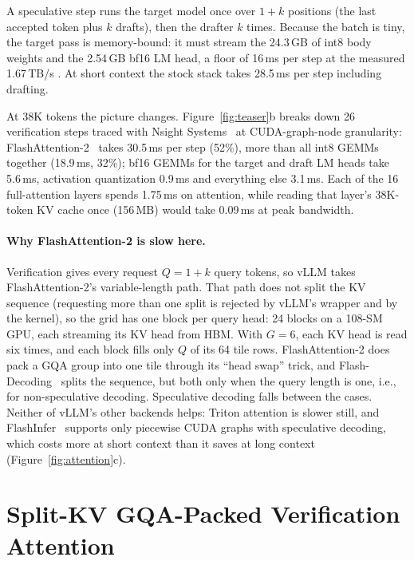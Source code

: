 \documentclass[acmtog,nonacm,screen]{acmart}
\newcommand{\ms}{\,ms\xspace}
\newcommand{\ie}{i.e.,\xspace}
\begin{document}
A speculative step runs the target model once over $1{+}k$ positions (the last accepted token plus $k$ drafts), then
the drafter $k$ times. Because the batch is tiny, the target pass is memory-bound: it must stream the 24.3\,GB of
int8 body weights and the 2.54\,GB bf16 LM head, a floor of 16\,ms per step at the measured 1.67\,TB/s
\cite{williams2009roofline}. At short context the stock stack takes 28.5\ms per step including drafting.

At 38K tokens the picture changes. Figure~\ref{fig:teaser}b breaks down 26 verification steps traced with Nsight
Systems~\cite{nvidia_nsys} at CUDA-graph-node granularity: FlashAttention-2~\cite{dao2024flashattention2} takes
30.5\ms per step (52\%), more than all int8 GEMMs together (18.9\ms, 32\%); bf16 GEMMs for the target and draft LM
heads take 5.6\ms, activation quantization 0.9\ms and everything else 3.1\ms. Each of the 16 full-attention layers
spends 1.75\ms on attention, while reading that layer's 38K-token KV cache once (156\,MB) would take 0.09\ms at peak
bandwidth.

\paragraph{Why FlashAttention-2 is slow here.} Verification gives every request $Q{=}1{+}k$ query tokens, so vLLM takes
FlashAttention-2's variable-length path. That path does not split the KV sequence (requesting more than one split is
rejected by vLLM's wrapper and by the kernel), so the grid has one block per query head: 24 blocks on a 108-SM GPU,
each streaming its KV head from HBM. With $G{=}6$, each KV head is read six times, and each block fills only $Q$ of its
64 tile rows. FlashAttention-2 does pack a GQA group into one tile through its ``head swap'' trick, and
Flash-Decoding~\cite{dao2023flashdecoding} splits the sequence, but both only when the query length is one, \ie for
non-speculative decoding. Speculative decoding falls between the cases. Neither of vLLM's other backends helps:
Triton attention is slower still, and FlashInfer~\cite{ye2025flashinfer} supports only piecewise CUDA graphs with
speculative decoding, which costs more at short context than it saves at long context
(Figure~\ref{fig:attention}c).

\section{Split-KV GQA-Packed Verification Attention}
\label{sec:attention}
\end{document}
